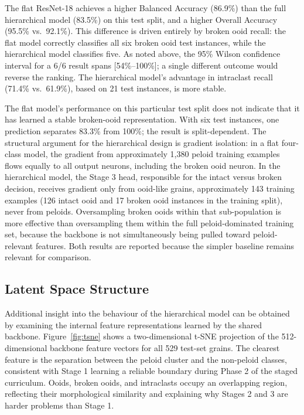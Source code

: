 \documentclass[a4paper,fleqn]{cas-dc}
\begin{document}
The flat ResNet-18 achieves a higher Balanced Accuracy (86.9\%) than the full hierarchical model (83.5\%) on this test split, and a higher Overall Accuracy (95.5\% vs.\ 92.1\%). This difference is driven entirely by broken ooid recall: the flat model correctly classifies all six broken ooid test instances, while the hierarchical model classifies five. As noted above, the 95\% Wilson confidence interval for a 6/6 result spans [54\%--100\%]; a single different outcome would reverse the ranking. The hierarchical model's advantage in intraclast recall (71.4\% vs.\ 61.9\%), based on 21 test instances, is more stable.

The flat model's performance on this particular test split does not indicate that it has learned a stable broken-ooid representation. With six test instances, one prediction separates 83.3\% from 100\%; the result is split-dependent. The structural argument for the hierarchical design is gradient isolation: in a flat four-class model, the gradient from approximately 1,380 peloid training examples flows equally to all output neurons, including the broken ooid neuron. In the hierarchical model, the Stage 3 head, responsible for the intact versus broken decision, receives gradient only from ooid-like grains, approximately 143 training examples (126 intact ooid and 17 broken ooid instances in the training split), never from peloids. Oversampling broken ooids within that sub-population is more effective than oversampling them within the full peloid-dominated training set, because the backbone is not simultaneously being pulled toward peloid-relevant features. Both results are reported because the simpler baseline remains relevant for comparison.

\subsection{Latent Space Structure}

Additional insight into the behaviour of the hierarchical model can be obtained by examining the internal feature representations learned by the shared backbone. Figure~\ref{fig:tsne} shows a two-dimensional t-SNE \citep{vandermaaten2008tsne} projection of the 512-dimensional backbone feature vectors for all 529 test-set grains. The clearest feature is the separation between the peloid cluster and the non-peloid classes, consistent with Stage 1 learning a reliable boundary during Phase 2 of the staged curriculum. Ooids, broken ooids, and intraclasts occupy an overlapping region, reflecting their morphological similarity and explaining why Stages 2 and 3 are harder problems than Stage 1.
\end{document}
